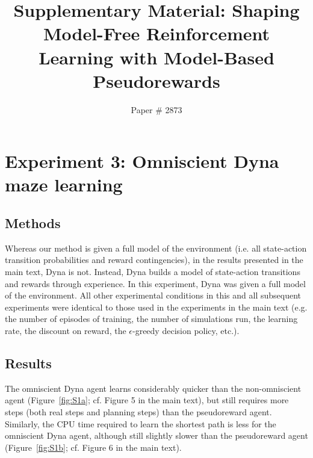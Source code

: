 \documentclass[letterpaper]{article}
\begin{document}
%

\title{Supplementary Material: Shaping Model-Free Reinforcement Learning with Model-Based Pseudorewards}
\author{  Paper \# 2873}
\date{}
\maketitle

\pagebreak

\section{Experiment 3: Omniscient Dyna maze learning}

\subsection{Methods}

Whereas our method is given a full model of the environment (i.e. all state-action transition probabilities and reward contingencies), in the results presented in the main text, Dyna is not. Instead, Dyna builds a model of state-action transitions and rewards through experience. In this experiment, Dyna was given a full model of the environment. All other experimental conditions in this and all subsequent experiments were identical to those used in the experiments in the main text (e.g. the number of episodes of training, the number of simulations run, the learning rate, the discount on reward, the $\epsilon$-greedy decision policy, etc.).

\subsection{Results}

The omniscient Dyna agent learns considerably quicker than the non-omniscient agent (Figure~\ref{fig:S1a}; cf. Figure 5 in the main text), but still requires more steps (both real steps and planning steps) than the pseudoreward agent. Similarly, the CPU time required to learn the shortest path is less for the omniscient Dyna agent, although still slightly slower than the pseudoreward agent (Figure~\ref{fig:S1b}; cf. Figure 6 in the main text).

\end{document}
